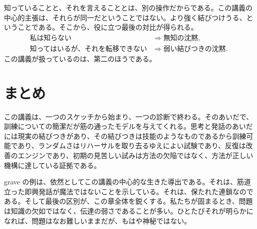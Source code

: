 知っていることと、それを言えることとは、別の操作だからである。この講義の中心的主張は、それらが同一だということではない。より強く結びつけうる、ということである。そこから、役に立つ最後の対比が得られる。
\begin{align}
\text{私は知らない} &\Longrightarrow \text{無知の沈黙},\\
\text{知ってはいるが、それを転移できない} &\Longrightarrow \text{弱い結びつきの沈黙}.
\end{align}
この講義が扱っているのは、第二のほうである。

\section{まとめ}

この講義は、一つのスケッチから始まり、一つの診断で終わる。そのあいだで、訓練についての簡潔だが筋の通ったモデルを与えてくれる。思考と発話のあいだには現実の結びつきがあり、その結びつきは技能のようなものであるから訓練可能であり、ランダムさはリハーサルを取り去るゆえによい試験であり、反復は改善のエンジンであり、初期の見苦しい試みは方法の欠陥ではなく、方法が正しい機構に達している証拠である。

grave の例は、依然としてこの講義の中心的な生きた導出である。それは、筋道立った即興発話が魔法ではないことを示している。それは、保たれた連鎖なのである。そして最後の区別が、この章全体を鋭くする。私たちが固まるとき、問題は知識の欠如ではなく、伝達の弱さであることが多い。ひとたびそれが明らかになれば、問題はなお難しいままだが、もはや神秘ではない。